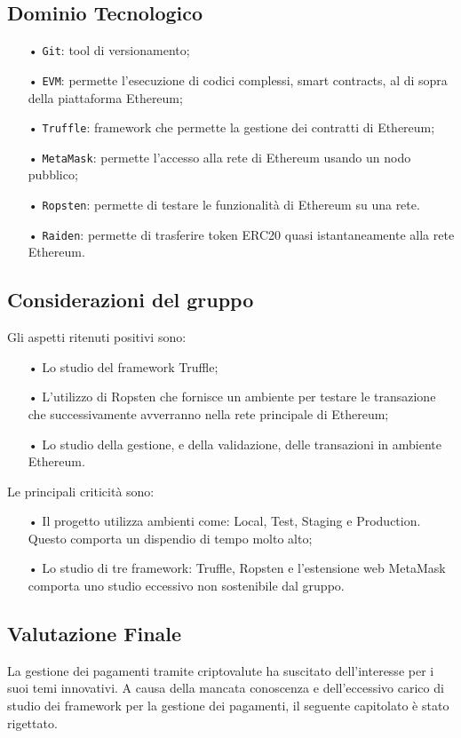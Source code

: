 \subsection{Dominio Tecnologico}
\begin{itemize}

\item[•] \texttt{Git}: tool di versionamento;
\item[•] \texttt{EVM}: permette l’esecuzione di codici complessi, smart contracts, al di sopra della piattaforma Ethereum;
\item[•] \texttt{Truffle}: framework che permette la gestione dei contratti di Ethereum;
\item[•] \texttt{MetaMask}: 
permette l'accesso alla rete di Ethereum usando un nodo pubblico; 
\item[•] \texttt{Ropsten}: permette di testare le funzionalità di Ethereum su una rete. 
\item[•] \texttt{Raiden}: permette di trasferire token ERC20 quasi istantaneamente alla rete Ethereum.

\end{itemize}

\subsection{Considerazioni del gruppo}

Gli aspetti ritenuti positivi sono: 
\begin{itemize}

\item[•] Lo studio del framework Truffle;
\item[•] L'utilizzo di Ropsten che fornisce un ambiente per testare le transazione che successivamente avverranno nella rete principale di Ethereum;
\item[•] Lo studio della gestione, e della validazione, delle transazioni in ambiente Ethereum.
\newline
\end{itemize}

Le principali criticità sono: 
\begin{itemize}

\item[•] Il progetto utilizza ambienti come: Local, Test, Staging e Production. Questo comporta un dispendio di tempo molto alto;

\item[•] Lo studio di tre framework: Truffle, Ropsten e l'estensione web MetaMask comporta uno studio eccessivo non sostenibile dal gruppo.

\end{itemize}


\subsection{Valutazione Finale}
La gestione dei pagamenti tramite criptovalute ha suscitato dell'interesse per i suoi temi innovativi. 
A causa della mancata conoscenza e dell'eccessivo carico di studio dei framework per la gestione dei pagamenti, il seguente capitolato è stato rigettato. 